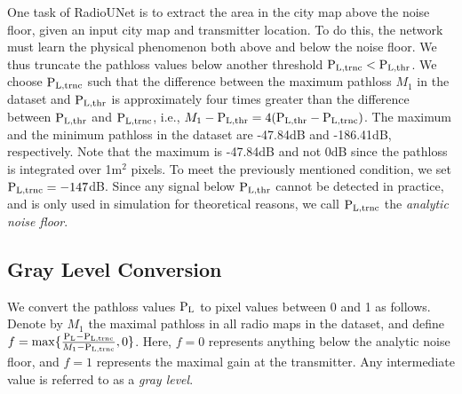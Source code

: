 \documentclass[10pt,a4paper]{article}
\begin{document}
One task of RadioUNet is to extract the area in the city map above 
the noise floor, 
given an input city map and transmitter location. To do this, the network must learn the physical phenomenon both above and below the noise floor.  We thus truncate the pathloss values below another threshold $\textup{P}_{\textup{L,trnc}} < \textup{P}_{\textup{L,thr}}$. We choose $\textup{P}_{\textup{L,trnc}}$ such that the difference between the maximum pathloss $M_1$ in the dataset and $\textup{P}_{\textup{L,thr}}$ is approximately four times greater than the difference between $\textup{P}_{\textup{L,thr}}$ and $\textup{P}_{\textup{L,trnc}}$, i.e., $M_1-\textup{P}_{\textup{L,thr}} = 4(\textup{P}_{\textup{L,thr}}-\textup{P}_{\textup{L,trnc}})$. The maximum and the minimum pathloss in the dataset are -47.84dB 
and -186.41dB, respectively. Note that the maximum is -47.84dB and not 0dB since the pathloss is integrated over 1m$^2$ pixels.  To meet the previously mentioned condition, we set $\textup{P}_{\textup{L,trnc}} = -147$dB. Since any signal below $\textup{P}_{\textup{L,thr}}$ cannot be detected in practice, and is only used in simulation for theoretical reasons, we call $\textup{P}_{\textup{L,trnc}}$ the \emph{analytic noise floor}.
%




 \subsection{Gray Level Conversion}
 \label{Gray Level Conversion}
 
 
We convert the pathloss values $\textup{P}_{\textup{L}}$ to pixel values between 0 and 1 as follows.
Denote by $M_1$ the maximal pathloss in all radio maps in the dataset, and define  $f=\max\{\frac{\textup{P}_{\textup{L}}-\textup{P}_{\textup{L,trnc}}}{M_1-\textup{P}_{\textup{L,trnc}}},0\}$. Here, $f=0$ represents anything below the analytic noise floor, and $f=1$ represents the maximal gain at the transmitter.
Any intermediate value is referred to as a \emph{gray level}.
\end{document}

